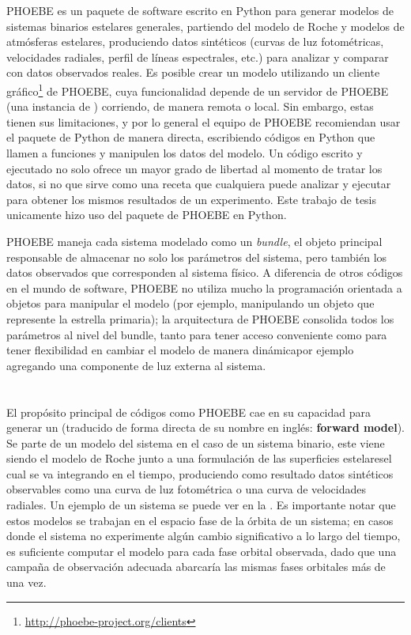 PHOEBE es un paquete de software escrito en Python para generar modelos de
sistemas binarios estelares generales, partiendo del modelo de Roche y modelos
de atmósferas estelares, produciendo datos sintéticos (curvas de luz
fotométricas, velocidades radiales, perfil de líneas espectrales, etc.) para
analizar y comparar con datos observados reales. Es posible crear un modelo
utilizando un cliente
gráfico\footnote{\protect\url{http://phoebe-project.org/clients}} de PHOEBE,
cuya funcionalidad depende de un servidor de PHOEBE (una instancia de
) corriendo, de manera remota o local. Sin embargo, estas
tienen sus limitaciones, y por lo general el equipo de PHOEBE recomiendan usar
el paquete de Python de manera directa, escribiendo códigos en Python que llamen
a funciones y manipulen los datos del modelo. Un código escrito y ejecutado no
solo ofrece un mayor grado de libertad al momento de tratar los datos, si no que
sirve como una receta que cualquiera puede analizar y ejecutar para obtener los
mismos resultados de un experimento. Este trabajo de tesis unicamente hizo uso
del paquete de PHOEBE en Python.

PHOEBE maneja cada sistema modelado como un \textit{bundle}, el objeto principal
responsable de almacenar no solo los parámetros del sistema, pero también los
datos observados que corresponden al sistema físico. A diferencia de otros
códigos en el mundo de software, PHOEBE no utiliza mucho la programación
orientada a objetos para manipular el modelo (por ejemplo, manipulando un objeto
que represente la estrella primaria); la arquitectura de PHOEBE consolida todos
los parámetros al nivel del bundle, tanto para tener acceso conveniente como
para tener flexibilidad en cambiar el modelo de manera dinámica\textemdash por
ejemplo agregando una componente de luz externa al sistema.

\section{}

El propósito principal de códigos como PHOEBE cae en su capacidad para generar
un  (traducido de forma directa de su nombre
en inglés: \textbf{forward model}). Se parte de un modelo del sistema\textemdash
en el caso de un sistema binario, este viene siendo el modelo de Roche junto a
una formulación de las superficies estelares\textemdash el cual se va integrando
en el tiempo, produciendo como resultado datos sintéticos observables como una
curva de luz fotométrica o una curva de velocidades radiales. Un ejemplo de un
sistema  se puede ver en la
. Es importante notar que estos
modelos se trabajan en el espacio fase de la órbita de un sistema; en casos
donde el sistema no experimente algún cambio significativo a lo largo del
tiempo, es suficiente computar el modelo para cada fase orbital observada, dado
que una campaña de observación adecuada abarcaría las mismas fases orbitales más
de una vez.

